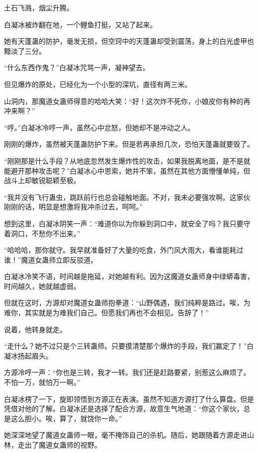 
\begin{this_body}



土石飞溅，烟尘升腾。

白凝冰被炸翻在地，一个鲤鱼打挺，又站了起来。

她有天蓬蛊的防护，毫发无损，但空窍中的天蓬蛊却受到震荡，身上的白光虚甲也黯淡了三分。

“什么东西作鬼？”白凝冰咒骂一声，凝神望去。

但见爆炸的原处，已经化为一个小型的深坑，直径有两三米。

山洞内，那魔道女蛊师得意的哈哈大笑：“好！这次炸不死你，小娘皮你有种的再冲来啊？”

“哼。”白凝冰冷哼一声，虽然心中忿怒，但她却不是冲动之人。

刚刚的爆炸，虽然被天蓬蛊防护下来。但是若再承担几次，恐怕天蓬蛊就要毁了。

“刚刚那是什么手段？从地底忽然发生爆炸性的攻击，如果我脱离地面，是不是就能避开那种攻击呢？”白凝冰心中思索，她并不笨，虽然在其他方面懵懂单纯，但战斗上却敏锐聪颖至极。

“我并没有飞行蛊虫，跳跃前行也总会碰触地面。不对，我未必要强攻啊。这家伙刚刚的话，明显是想激将我冲杀过去，呵呵。”

想到这里，白凝冰阴笑一声：“难道你以为你躲到洞口中，就安全了吗？我只要守着洞口，不愁你不出来。”

“哈哈哈，那你就守。我早就准备好了大量的吃食，外门风大雨大，看谁能耗过谁！”魔道女蛊师立即反驳道。

白凝冰冷笑不语，时间越是拖延，对她越有利。因为这魔道女蛊师身中绿蟒毒害，时间越久，她就越虚弱。

但就在这时，方源却对魔道女蛊师抱拳道：“山野偶遇，我们纯粹是路过。唉，为难你，其实就是为难我们自己。但愿我们再也不会相见。告辞了！”

说着，他转身就走。

“走什么？她不过只是个三转蛊师。只要摸清楚那个爆炸的手段，我们赢定了！”白凝冰扬起眉头。

方源冷哼一声：“你也是三转，我才一转。我们还是赶路要紧，别惹这么麻烦了。不怕一万，就怕万一啊。”

白凝冰楞了一下，旋即领悟到方源正在表演。虽然不知道方源打了什么算盘。但是凭借对他的了解。白凝冰还是选择了配合方源，故意生气地道：“你这个家伙，总是这么胆小。唉，算了，就饶你一命。”

她深深地望了魔道女蛊师一眼，毫不掩饰自己的杀机。随后，她跟随着方源走进山林，走出了魔道女蛊师的视野。


\end{this_body}
